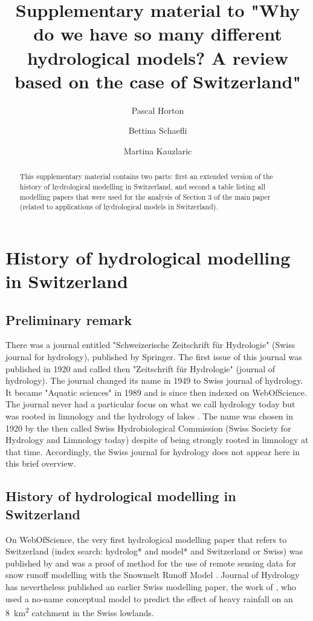 \documentclass{article}
\title{Supplementary material to "Why do we have so many different hydrological models? A review based on the case of Switzerland"}
\author[1]{Pascal Horton}
\author[1]{Bettina Schaefli}
\author[1]{Martina Kauzlaric}
\affil[1]{Institute of Geography \& Oeschger Centre for Climate Change Research, University of Bern, Bern, Switzerland}
\date{}
\begin{document}
	
\maketitle

\begin{abstract}
	This supplementary material contains two parts: first an extended version of the history of hydrological modelling in Switzerland, and second a table listing all modelling papers that were used for the analysis of Section 3 of the main paper (related to applications of hydrological models in Switzerland).
\end{abstract}



\section{History of hydrological modelling in Switzerland}


\subsection{Preliminary remark}

There was a journal entitled "Schweizerische Zeitschrift für Hydrologie" (Swiss journal for hydrology), published by Springer. The first issue of this journal was published in 1920 and called then "Zeitschrift für Hydrologie" (journal of hydrology). The journal changed its name in 1949 to Swiss journal of hydrology. It became "Aquatic sciences" in 1989 \citep{bossard1989} and is since then indexed on WebOfScience. The journal never had a particular focus on what we call hydrology today but was rooted in limnology and the hydrology of lakes \citep{tockner2009}. The name was chosen in 1920 by the then called Swiss Hydrobiological Commission (Swiss Society for Hydrology and Limnology today) \citep{perret2001} despite of being strongly rooted in limnology at that time. Accordingly, the Swiss journal for hydrology does not appear here in this brief overview.


\subsection{History of hydrological modelling in Switzerland}

On WebOfScience, the very first hydrological modelling paper that refers to Switzerland (index search: hydrolog* and model* and Switzerland or Swiss) was published by \citet{baumgartner1986} and was a proof of method for the use of remote sensing data for snow runoff modelling with the Snowmelt Runoff Model \citep[SRM,][]{martinec1975}. Journal of Hydrology has nevertheless published an earlier Swiss modelling paper, the work of \citet{hager1984}, who used a no-name conceptual model to predict the effect of heavy rainfall on an 8~km\textsuperscript{2} catchment in the Swiss lowlands.
\end{document}
